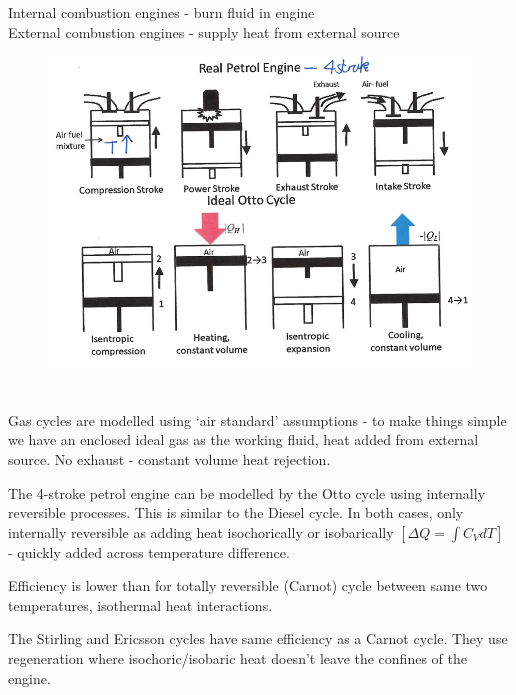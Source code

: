 \documentclass[a4paper, 11pt, normalem]{report}
\begin{document}
Internal combustion engines - burn fluid in engine \\
External combustion engines - supply heat from external source
\begin{figure}[H]
    \includegraphics[scale=0.5]{Petril.png}
\end{figure}

\chapter{}
Gas cycles are modelled using `air standard' assumptions - to make things simple we have an enclosed ideal gas as the working fluid, heat added from external source.
No exhaust - constant volume heat rejection. 

The 4-stroke petrol engine can be modelled by the Otto cycle using internally reversible processes.
This is similar to the Diesel cycle.
In both cases, only internally reversible as adding heat isochorically or isobarically $[\Delta Q = \int C_V dT]$ - quickly added across temperature difference. 

Efficiency is lower than for totally reversible (Carnot) cycle between same two temperatures, isothermal heat interactions. 

The Stirling and Ericsson cycles have same efficiency as a Carnot cycle.
They use regeneration where isochoric/isobaric heat doesn't leave the confines of the engine.
\end{document}
